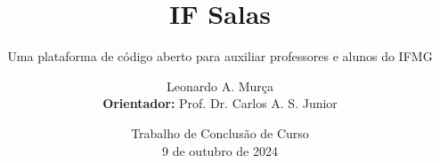 \documentclass[12pt]{beamer}
\begin{document}
    \author[]{
        Leonardo A. Murça
        \vspace{1mm} \\ 
        \footnotesize {\textbf{Orientador:} Prof. Dr. Carlos A. S. Junior} \\
    }

    \title{\textbf{IF Salas}}
    \subtitle{Uma plataforma de código aberto para auxiliar professores e alunos do IFMG}


    \date[\small 9 de outubro de 2024]{
        \tiny {Trabalho de Conclusão de Curso} \\ 
        \tiny 9 de outubro de 2024 
    }

    \ifmglogo
\end{document}
